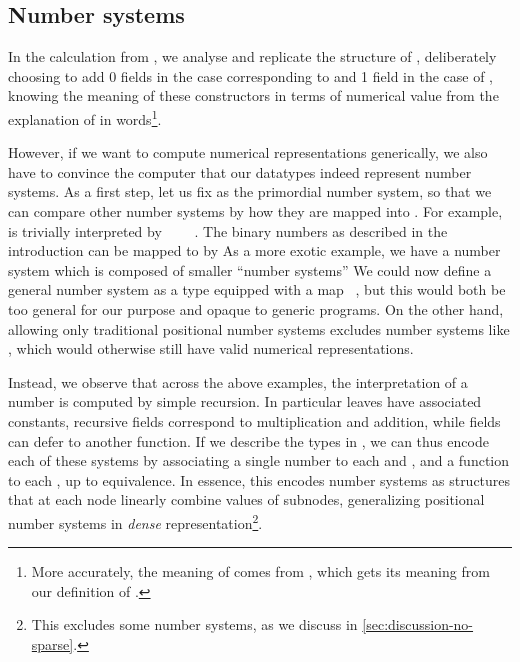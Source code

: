 
\subsection{Number systems}\label{ssec:numbers}
In the calculation  from \bN{}, we analyse and replicate the structure of \bN{}, deliberately choosing to add 0 fields in the case corresponding to  and 1 field in the case of , knowing the meaning of these constructors in terms of numerical value from the explanation of \bN{} in words\footnote{More accurately, the meaning of \bN{} comes from , which gets its meaning from our definition of \AF{\_<\_}.}. 

However, if we want to compute numerical representations generically, we also have to convince the computer that our datatypes indeed represent number systems. As a first step, let us fix \bN{} as the primordial number system, so that we can compare other number systems by how they are mapped into \bN{}. For example, \bN{} is trivially interpreted by \ \AV{:}\ \bN{}\ \ \bN{}. The binary numbers as described in the introduction can be mapped to \bN{} by
As a more exotic example, we have a number system
which is composed of smaller ``number systems''
We could now define a general number system as a type  equipped with a map \ \bN{}, but this would both be too general for our purpose and opaque to generic programs. On the other hand, allowing only traditional positional number systems excludes number systems like , which would otherwise still have valid numerical representations.

Instead, we observe that across the above examples, the interpretation of a number is computed by simple recursion. In particular leaves have associated constants, recursive fields correspond to multiplication and addition, while fields can defer to another function. If we describe the types in , we can thus encode each of these systems by associating a single number to each  and , and a function to each , up to equivalence. In essence, this encodes number systems as structures that at each node linearly combine values of subnodes, generalizing positional number systems in \emph{dense} representation\footnote{This excludes some number systems, as we discuss in \autoref{sec:discussion-no-sparse}.}.


